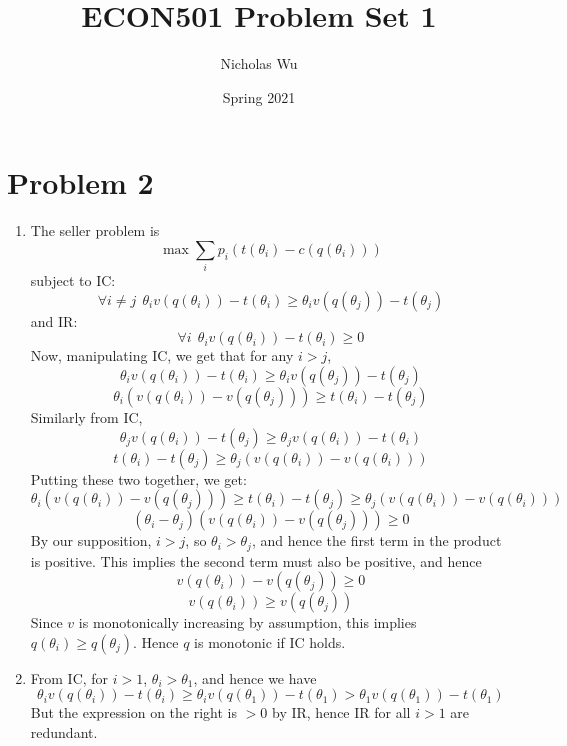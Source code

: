 \documentclass[10pt,letter]{article}
\begin{document}


\title{ECON501 Problem Set 1}

\author{Nicholas Wu}

\date{Spring 2021}

\maketitle

\section*{Problem 2}
\begin{enumerate}[label=(\alph*)]
\item The seller problem is
\[ \max \sum_i p_i (t(\theta_i) - c(q(\theta_i))) \]
subject to IC:
\[ \forall i\neq j \ \ \theta_i v(q(\theta_i)) - t(\theta_i) \ge \theta_i v(q(\theta_j)) - t(\theta_j) \]
and IR:
\[ \forall i \ \ \theta_i v(q(\theta_i)) - t(\theta_i) \ge 0 \]
Now, manipulating IC, we get that for any $i > j$,
\[ \theta_i v(q(\theta_i)) - t(\theta_i) \ge \theta_i v(q(\theta_j)) - t(\theta_j) \]
\[ \theta_i (v(q(\theta_i)) - v(q(\theta_j))) \ge t(\theta_i)  - t(\theta_j) \]
Similarly from IC,
\[ \theta_j v(q(\theta_i)) - t(\theta_j) \ge \theta_j v(q(\theta_i)) - t(\theta_i) \]
\[ t(\theta_i) - t(\theta_j) \ge \theta_j (v(q(\theta_i)) -  v(q(\theta_i))) \]
Putting these two together, we get:
\[ \theta_i (v(q(\theta_i)) - v(q(\theta_j))) \ge t(\theta_i)  - t(\theta_j) \ge \theta_j (v(q(\theta_i)) -  v(q(\theta_i))) \]
\[ (\theta_i - \theta_j)(v(q(\theta_i)) - v(q(\theta_j))) \ge 0 \]
By our supposition, $i > j$, so $\theta_i > \theta_j$, and hence the first term in the product is positive. This implies the second term must also be positive, and hence
\[ v(q(\theta_i)) - v(q(\theta_j)) \ge 0 \]
\[ v(q(\theta_i)) \ge v(q(\theta_j)) \]
Since $v$ is monotonically increasing by assumption, this implies $q(\theta_i) \ge q(\theta_j)$. Hence $q$ is monotonic if IC holds.
\item
From IC, for $i > 1$, $\theta_i > \theta_1$, and hence we have
\[ \theta_i v(q(\theta_i)) - t(\theta_i) \ge \theta_i v(q(\theta_1)) - t(\theta_1) > \theta_1 v(q(\theta_1)) - t(\theta_1)  \]
But the expression on the right is $> 0$ by IR, hence IR for all $i > 1$ are redundant.


\end{enumerate}
\end{document}
